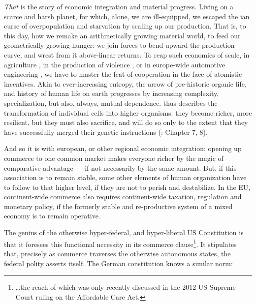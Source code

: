 \emph{That} is the story of economic integration and material progress. Living on a scarce and harsh planet, for which, alone, we are ill-equipped, we escaped the \citeauthor{Malthus1798}ian curse of overpopulation and starvation by scaling up our production. That is, to this day, how we remake an arithmetically growing material world, to feed our geometrically growing hunger: we join forces to bend upward the production curve, and wrest from it above-linear returns. To reap such economies of scale, in agriculture \citep{Diamond1997}, in the production of violence \citep{Tilly-1985-aa}, or in europe-wide automotive engineering \citep{Krugman-1980-aa}, we have to master the feat of cooperation in the face of atomistic incentives. Akin to ever-increasing entropy, the arrow of pre-historic organic life, and history of human life on earth progresses by increasing complexity, specialization, but also, always, mutual dependence. \citeauthor{Wright1994} thus describes the transformation of individual cells into higher organisms: they become richer, more resilient, but they must also sacrifice, and will do so only to the extent that they have successfully merged their genetic instructions (\citeyear{Wright1994}: Chapter 7, 8). %

And so it is with european, or other regional economic integration: opening up commerce to one common market makes everyone richer by the magic of comparative advantage --- if not necessarily by the same amount. But, if this association is to remain stable, some other elements of human organization have to follow to that higher level, if they are not to perish and destabilize. In the \gls{EU}, continent-wide commerce also requires continent-wide taxation, regulation and monetary policy, if the formerly stable and re-productive system of a mixed economy is to remain operative.

The genius of the otherwise hyper-federal, and hyper-liberal US Constitution is that it foresees this functional necessity in its commerce clause\footnote{
	\ldots the reach of which was only recently discussed in the 2012 US Supreme Court ruling on the Affordable Care Act.}.
It stipulates that, precisely as commerce traverses the otherwise autonomous states, the federal polity asserts itself. The German constitution knows a similar norm:

